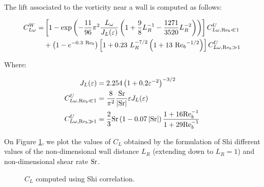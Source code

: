 \npar

The lift associated to the vorticity near a wall is computed as follows:

\begin{align}
C_{L\omega}^{W} =& \crocht{ 1-\exp{ -\frac{11}{96}\pi^{2}\frac{L_{\omega}}{J_{L}(\varepsilon)} \parth{1+\frac{9}{8}L_{R}^{-1}-\frac{1271}{3520}L_{R}^{-2}} } }C_{L\omega, \Re_{b} \ll 1}^{U}\\
%
 & + \parth{1-e^{-0.3\ \Re_{b}} } \crocht{1+0.23\ L_{R}^{-7/2} \parth{1+13\ {\Re_{b}}^{-1/2}}} C_{L\omega, \Re_{b} \gg 1}^{U}
\end{align}

Where:

\begin{align}
J_{L}(\varepsilon)&=2.254 \parth{1+0.2\varepsilon^{-2}}^{-3/2} \\
%
C_{L\omega, \Re_{b} \ll 1}^{U} &= \frac{8}{\pi^{2}} \frac{\Sr}{\bars{\Sr}}\varepsilon J_{L}(\varepsilon)\\
%
C_{L\omega, \Re_{b} \gg 1}^{U}&= \frac{2}{3}\Sr \parth{ 1-0.07\bars{\Sr} }\frac{1+16\Re_{b}^{-1}}{1+29\Re_{b}^{-1}}
\end{align}


On Figure \ref{fig:lift_shi}, we plot the values of $C_{L}$ obtained by the formulation of Shi \etal different values of the non-dimensional wall distance $L_{R}$ (extending down to $L_{R}=1$) and non-dimensional shear rate $\mathrm{Sr}$.

\begin{figure}[h!]


\caption{$C_{L}$ computed using Shi \etal correlation.}
\label{fig:lift_shi}
\end{figure}

